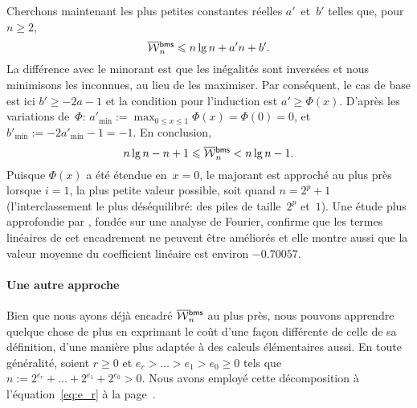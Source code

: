 Cherchons maintenant les plus petites constantes réelles
\(a'\)~et~\(b'\) telles que, pour \(n \geqslant 2\),
\begin{equation*}
\OW{\fun{bms}}{n} \leqslant n\lg n + a'n + b'.
\end{equation*}
La différence avec le minorant est que les inégalités sont inversées
et nous minimisons les inconnues, au lieu de les maximiser. Par
conséquent, le cas de base est ici \(b' \geqslant -2a - 1\) et la
condition pour l'induction est \(a' \geqslant \Phi(x)\). D'après les
variations de~\(\Phi\): \(a'_{\min} := \max_{0 \leqslant x \leqslant
  1}\Phi(x) = \Phi(0) = 0\), et \(b'_{\min} := -2a'_{\min} - 1 =
-1\). En conclusion,
\begin{equation}
n\lg n - n + 1 \leqslant \OW{\fun{bms}}{n} < n\lg n - 1.
\label{ineq:OWbms}
\end{equation}
Puisque \(\Phi(x)\) a été étendue en~\(x=0\), le majorant est approché
au plus près lorsque \(i=1\), la plus petite valeur possible, soit
quand \(n=2^p+1\) (l'interclassement le plus déséquilibré: des piles
de taille~\(2^p\) et~\(1\)). Une étude plus approfondie par
\cite{PannyProdinger_1995}, fondée sur une analyse de Fourier,
confirme que les termes linéaires de cet encadrement ne peuvent être
améliorés et elle montre aussi que la valeur moyenne du coefficient
linéaire est environ \(-0.70057\).


\paragraph{Une autre approche}

Bien que nous ayons déjà encadré \(\OW{\fun{bms}}{n}\) au plus près,
nous pouvons apprendre quelque chose de plus en exprimant le coût
d'une façon différente de celle de sa définition, d'une manière plus
adaptée à des calculs élémentaires aussi. En toute généralité, soient
\(r \geqslant 0\) et \(e_r > \dots > e_1 > e_0 \geqslant 0\) tels que
\(n := 2^{e_r} + \dots + 2^{e_1} + 2^{e_0} > 0\). Nous avons employé
cette décomposition à l'équation~\eqref{eq:e_r} à la
page~\pageref{eq:e_r}.

